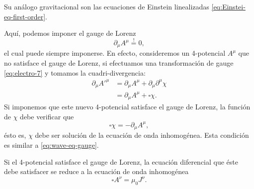 \documentclass[letterpaper,11pt]{article}
\begin{document}
Su análogo gravitacional son las ecuaciones de Einstein linealizadas \eqref{eq:Einstei-eq-first-order}.

Aquí, podemos imponer el gauge de Lorenz 
\begin{equation}
\partial_{\mu} A^{\mu} \stackrel{!}{=} 0, \label{eq:electro-11}
\end{equation}
el cual puede siempre imponerse. En efecto, consideremos un 4-potencial $A^{\mu}$ que no satisface el gauge de Lorenz, si efectuamos una transformación de gauge \eqref{eq:electro-7} y tomamos la cuadri-divergencia:
\begin{align}
\partial_{\mu} A'^{\mu} &= \partial_{\mu} A^{\mu} + \partial_{\mu} \partial^{\mu} \chi \nonumber \\
&= \partial_{\mu} A^{\mu} + \square \chi. \label{eq:electro-12}
\end{align}
Si imponemos que este nuevo 4-potencial satisface el gauge de Lorenz, la función de $\chi$ debe verificar que
\begin{equation}
\square \chi = - \partial_{\mu} A^{\mu}, \label{eq:electro-13}
\end{equation}
ésto es, $\chi$ debe ser solución de la ecuación de onda inhomogénea. Esta condición es similar a \eqref{eq:wave-eq-gauge}.

Si el 4-potencial satisface el gauge de Lorenz, la ecuación diferencial que éste debe satisfacer se reduce a la ecuación de onda inhomogénea
\begin{equation}
\square A^{\nu} = \mu_0 J^{\nu}.
\end{equation}
\end{document}
